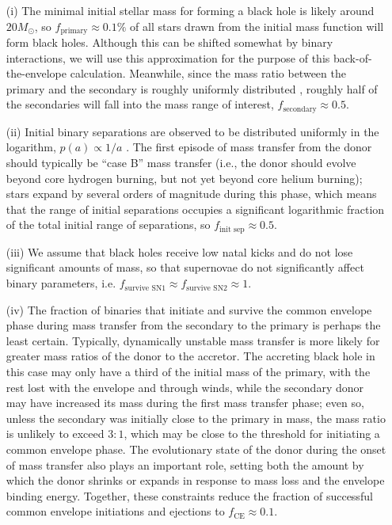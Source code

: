 \documentclass[iop,onecolumn]{revtex4}
\begin{document}
\begin{enumerate}
	\item[(i)] The minimal initial stellar mass for forming a black hole is likely around $20 M_\odot$, so $f_\textrm{primary} \approx 0.1\%$ of all stars drawn from the \citet{Kroupa:2002} initial mass function will form black holes. Although this can be shifted somewhat by binary interactions, we will use this approximation for the purpose of this back-of-the-envelope calculation. Meanwhile, since the mass ratio between the primary and the secondary is roughly uniformly distributed \citep{Sana:2012,MoeDiStefano:2017}, roughly half of the secondaries will fall into the mass range of interest, $f_\textrm{secondary} \approx 0.5$.  

\item[(ii)] Initial binary  separations are observed to be distributed uniformly in the logarithm, $p(a) \propto 1/a$ \citep{Opik:1924}.  The first episode of mass transfer from the donor should typically be ``case B'' mass transfer (i.e., the donor should evolve beyond core hydrogen burning, but not yet beyond core helium burning); stars expand by several orders of magnitude during this phase, which means that the range of initial separations occupies a significant logarithmic fraction of the total initial range of separations, so $f_\textrm{init sep} \approx 0.5$.  

\item[(iii)]  We assume that black holes receive low natal kicks and do not lose significant amounts of mass, so that supernovae do not significantly affect binary parameters, i.e. $f_\textrm{survive SN1} \approx f_\textrm{survive SN2} \approx 1$.  

\item[(iv)] The fraction of binaries that initiate and survive the common envelope phase during mass transfer from the secondary to the primary is perhaps the least certain.  Typically, dynamically unstable mass transfer is more likely for greater mass ratios of the donor to the accretor.  The accreting black hole in this case may only have a third of the initial mass of the primary, with the rest lost with the envelope and through winds, while the secondary donor may have increased its mass during the first mass transfer phase; even so, unless the secondary was initially close to the primary in mass, the mass ratio is unlikely to exceed $3:1$, which may be close to the threshold for initiating a common envelope phase.  The evolutionary state of the donor during the onset of mass transfer also plays an important role, setting both the amount by which the donor shrinks or expands in response to mass loss and the envelope binding energy.  Together, these constraints reduce the fraction of successful common envelope initiations and ejections to $f_\textrm{CE} \approx 0.1$.  


\end{enumerate}
\end{document}
